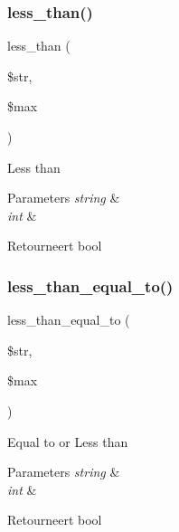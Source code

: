 \subsubsection{\texorpdfstring{less\_than()}{less\_than()}}
{\footnotesize\ttfamily less\+\_\+than (\begin{DoxyParamCaption}\item[{}]{\$str,  }\item[{}]{\$max }\end{DoxyParamCaption})}

Less than


\begin{DoxyParams}{Parameters}
{\em string} & \\
\hline
{\em int} & \\
\hline
\end{DoxyParams}
\begin{DoxyReturn}{Retourneert}
bool 
\end{DoxyReturn}
\mbox{\label{class_c_i___form__validation_aa7a42f791a145f6c36ad2b8babcb9c21}} 
\subsubsection{\texorpdfstring{less\_than\_equal\_to()}{less\_than\_equal\_to()}}
{\footnotesize\ttfamily less\+\_\+than\+\_\+equal\+\_\+to (\begin{DoxyParamCaption}\item[{}]{\$str,  }\item[{}]{\$max }\end{DoxyParamCaption})}

Equal to or Less than


\begin{DoxyParams}{Parameters}
{\em string} & \\
\hline
{\em int} & \\
\hline
\end{DoxyParams}
\begin{DoxyReturn}{Retourneert}
bool 
\end{DoxyReturn}
\mbox{\label{class_c_i___form__validation_aefdd25116835b684a2ab9ce6ef58d38c}} 
